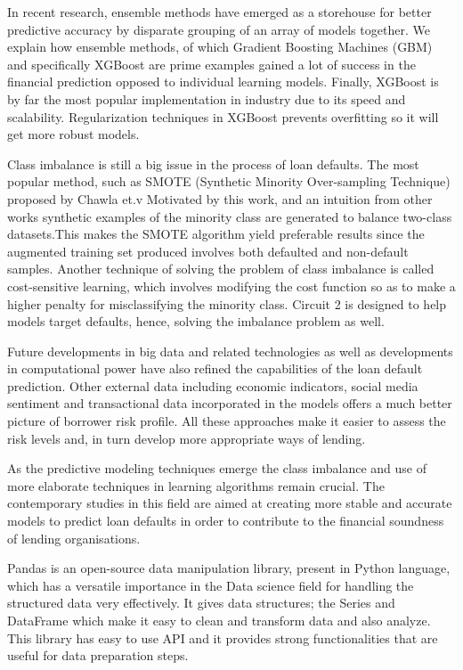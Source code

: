 \documentclass[12pt, a4paper,oneside]{book}
\numberwithin{equation}{section}
\begin{document}
In recent research, ensemble methods have emerged as a storehouse for better predictive accuracy by disparate grouping of an array of models together. We explain how ensemble methods, of which Gradient Boosting Machines (GBM) and specifically XGBoost are prime examples gained a lot of success in the financial prediction opposed to individual learning models. Finally, XGBoost is by far the most popular implementation in industry due to its speed and scalability. Regularization techniques in XGBoost prevents overfitting so it will get more robust models.

Class imbalance is still a big issue in the process of loan defaults. The most popular method, such as SMOTE (Synthetic Minority Over-sampling Technique) proposed by Chawla et.v Motivated by this work, and an intuition from other works \cite{chawla2002} synthetic examples of the minority class are generated to balance two-class datasets.This makes the SMOTE algorithm yield preferable results since the augmented training set produced involves both defaulted and non-default samples. Another technique of solving the problem of class imbalance is called cost-sensitive learning, which involves modifying the cost function so as to make a higher penalty for misclassifying the minority class. Circuit 2 is designed to help models target defaults, hence, solving the imbalance problem as well. 

Future developments in big data and related technologies as well as developments in computational power have also refined the capabilities of the loan default prediction. Other external data including economic indicators, social media sentiment and transactional data incorporated in the models offers a much better picture of borrower risk profile. All these approaches make it easier to assess the risk levels and, in turn develop more appropriate ways of lending. 

As the predictive modeling techniques emerge the class imbalance and use of more elaborate techniques in learning algorithms remain crucial. The contemporary studies in this field are aimed at creating more stable and accurate models to predict loan defaults in order to contribute to the financial soundness of lending organisations. 

Pandas is an open-source data manipulation library, present in Python language, which has a versatile importance in the Data science field for handling the structured data very effectively. It gives data structures; the Series and DataFrame which make it easy to clean and transform data and also analyze. This library has easy to use API and it provides strong functionalities that are useful for data preparation steps. 
\end{document}

